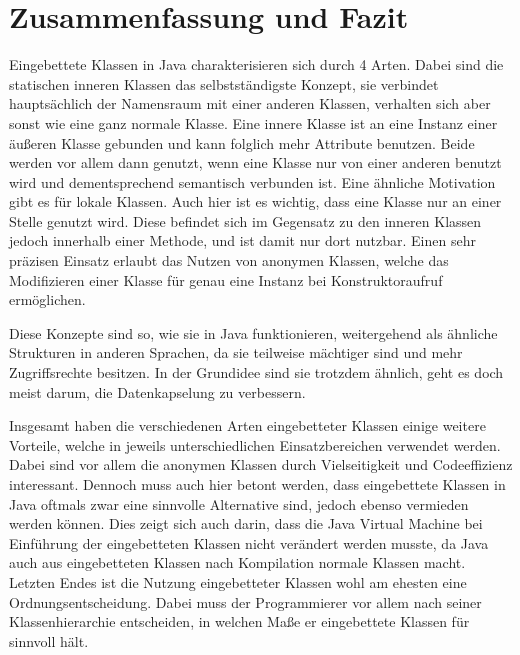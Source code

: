 \chapter{Zusammenfassung und Fazit}

Eingebettete Klassen in Java charakterisieren sich durch 4 Arten.
Dabei sind die statischen inneren Klassen das selbstständigste Konzept, sie verbindet hauptsächlich der Namensraum mit einer anderen Klassen, verhalten sich aber sonst wie eine ganz normale Klasse.
Eine innere Klasse ist an eine Instanz einer äußeren Klasse gebunden und kann folglich mehr Attribute benutzen.
Beide werden vor allem dann genutzt, wenn eine Klasse nur von einer anderen benutzt wird und dementsprechend semantisch verbunden ist.
Eine ähnliche Motivation gibt es für lokale Klassen. Auch hier ist es wichtig, dass eine Klasse nur an einer Stelle genutzt wird.
Diese befindet sich im Gegensatz zu den inneren Klassen jedoch innerhalb einer Methode, und ist damit nur dort nutzbar.
Einen sehr präzisen Einsatz erlaubt das Nutzen von anonymen Klassen, welche das Modifizieren einer Klasse für genau eine Instanz bei Konstruktoraufruf ermöglichen.

Diese Konzepte sind so, wie sie in Java funktionieren, weitergehend als ähnliche Strukturen in anderen Sprachen, da sie teilweise mächtiger sind und mehr Zugriffsrechte besitzen.
In der Grundidee sind sie trotzdem ähnlich, geht es doch meist darum, die Datenkapselung zu verbessern.

Insgesamt haben die verschiedenen Arten eingebetteter Klassen einige weitere Vorteile, welche in jeweils unterschiedlichen Einsatzbereichen verwendet werden.
Dabei sind vor allem die anonymen Klassen durch Vielseitigkeit und Codeeffizienz interessant.
Dennoch muss auch hier betont werden, dass eingebettete Klassen in Java oftmals zwar eine sinnvolle Alternative sind, jedoch ebenso vermieden werden können.
Dies zeigt sich auch darin, dass die Java Virtual Machine bei Einführung der eingebetteten Klassen nicht verändert werden musste, da Java auch aus eingebetteten Klassen nach Kompilation normale Klassen macht.
Letzten Endes ist die Nutzung eingebetteter Klassen wohl am ehesten eine Ordnungsentscheidung.
Dabei muss der Programmierer vor allem nach seiner Klassenhierarchie entscheiden,
in welchen Maße er eingebettete Klassen für sinnvoll hält.
